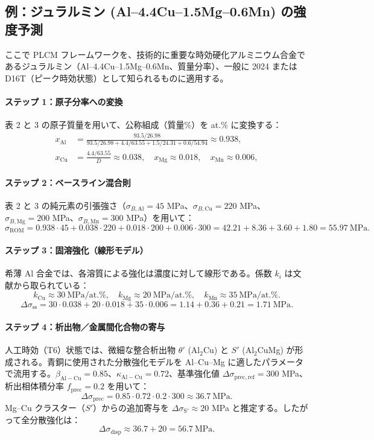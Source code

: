 \documentclass[11pt,a4paper]{article}
\theoremstyle{remark}
\begin{document}
	\subsection{例：ジュラルミン (Al–4.4Cu–1.5Mg–0.6Mn) の強度予測}
	\label{subsec:example-duralumin}
	
	ここで PLCM フレームワークを、技術的に重要な時効硬化アルミニウム合金であるジュラルミン（Al–4.4Cu–1.5Mg–0.6Mn、質量分率）、一般に 2024 または D16T（ピーク時効状態）として知られるものに適用する。
	
	\paragraph{ステップ 1：原子分率への変換}
	表 2 と 3 の原子質量を用いて、公称組成（質量\%）を at.\% に変換する：
	\[
	\begin{aligned}
		x_{\mathrm{Al}} &= \frac{93.5/26.98}{93.5/26.98+4.4/63.55+1.5/24.31+0.6/54.94} \approx 0.938,\\
		x_{\mathrm{Cu}} &= \frac{4.4/63.55}{D} \approx 0.038,\quad
		x_{\mathrm{Mg}} \approx 0.018,\quad
		x_{\mathrm{Mn}} \approx 0.006,
	\end{aligned}
	\]
	
	\paragraph{ステップ 2：ベースライン混合則}
	表 2 と 3 の純元素の引張強さ（\(\sigma_{B,\mathrm{Al}}=45\) MPa、\(\sigma_{B,\mathrm{Cu}}=220\) MPa、\(\sigma_{B,\mathrm{Mg}}=200\) MPa、\(\sigma_{B,\mathrm{Mn}}=300\) MPa）を用いて：
	\[
	\sigma_{\mathrm{ROM}} = 0.938\cdot45 + 0.038\cdot220 + 0.018\cdot200 + 0.006\cdot300
	= 42.21 + 8.36 + 3.60 + 1.80 = 55.97\ \text{MPa}.
	\]
	
	\paragraph{ステップ 3：固溶強化（線形モデル）}
	希薄 Al 合金では、各溶質による強化は濃度に対して線形である。係数 \(k_i\) は文献から取られている：
	\[
	k_{\mathrm{Cu}} \approx 30\ \text{MPa/at.\%},\quad
	k_{\mathrm{Mg}} \approx 20\ \text{MPa/at.\%},\quad
	k_{\mathrm{Mn}} \approx 35\ \text{MPa/at.\%}.
	\]
	\[
	\Delta\sigma_{\mathrm{ss}} = 30\cdot0.038 + 20\cdot0.018 + 35\cdot0.006
	= 1.14 + 0.36 + 0.21 = 1.71\ \text{MPa}.
	\]
	
	\paragraph{ステップ 4：析出物／金属間化合物の寄与}
	人工時効（T6）状態では、微細な整合析出物 \(\theta'\) (Al\(_2\)Cu) と \(S'\) (Al\(_2\)CuMg) が形成される。青銅に使用された分散強化モデルを Al–Cu–Mg に適したパラメータで流用する。\(\beta_{\mathrm{Al-Cu}}=0.85\)、\(\kappa_{\mathrm{Al-Cu}}=0.72\)、基準強化値 \(\Delta\sigma_{\mathrm{prec,ref}}=300\) MPa、析出相体積分率 \(f_{\mathrm{prec}}=0.2\) を用いて：
	\[
	\Delta\sigma_{\mathrm{prec}} = 0.85\cdot0.72\cdot0.2\cdot300 \approx 36.7\ \text{MPa}.
	\]
	Mg–Cu クラスター（\(S'\)）からの追加寄与を \(\Delta\sigma_{\mathrm{S'}} \approx 20\) MPa と推定する。したがって全分散強化は：
	\[
	\Delta\sigma_{\mathrm{disp}} \approx 36.7 + 20 = 56.7\ \text{MPa}.
	\]
	
\end{document}
